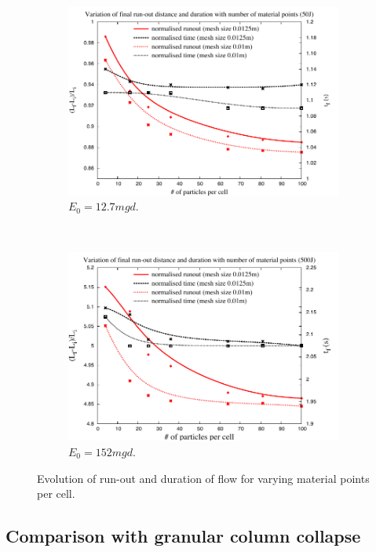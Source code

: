 \begin{figure}[tbhp]
\centering
\begin{subfigure}[b]{0.95\textwidth}
\includegraphics[width=\textwidth]{50}
\caption{$E_0=12.7mgd$.}
\label{fig:50}
\end{subfigure}
\\
\begin{subfigure}[b]{0.95\textwidth}
\centering
\includegraphics[width=\textwidth]{500}
\caption{$E_0=152mgd$.}
\label{fig:500}
\end{subfigure}
\caption{Evolution of run-out and duration of flow  for varying material points 
per cell.}
\label{fig:MPM_Size_Effect}
\end{figure}

\subsection{Comparison with granular column collapse}


